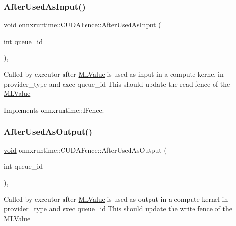 \subsubsection{\texorpdfstring{After\+Used\+As\+Input()}{AfterUsedAsInput()}}
{\footnotesize\ttfamily \mbox{\hyperlink{mlasi_8h_a88f941d423cb2a819b70a1358982b1a6}{void}} onnxruntime\+::\+C\+U\+D\+A\+Fence\+::\+After\+Used\+As\+Input (\begin{DoxyParamCaption}\item[{int}]{queue\+\_\+id }\end{DoxyParamCaption})\hspace{0.3cm}{\ttfamily [override]}, {\ttfamily [virtual]}}

Called by executor after \mbox{\hyperlink{classonnxruntime_1_1MLValue}{M\+L\+Value}} is used as input in a compute kernel in provider\+\_\+type and exec queue\+\_\+id This should update the read fence of the \mbox{\hyperlink{classonnxruntime_1_1MLValue}{M\+L\+Value}} 

Implements \mbox{\hyperlink{classonnxruntime_1_1IFence_af35eb555df9118afd4686e55f41b62a2}{onnxruntime\+::\+I\+Fence}}.

\mbox{\label{classonnxruntime_1_1CUDAFence_aa28331c001ce365edb1aca7e8c801c3f}} 
\subsubsection{\texorpdfstring{After\+Used\+As\+Output()}{AfterUsedAsOutput()}}
{\footnotesize\ttfamily \mbox{\hyperlink{mlasi_8h_a88f941d423cb2a819b70a1358982b1a6}{void}} onnxruntime\+::\+C\+U\+D\+A\+Fence\+::\+After\+Used\+As\+Output (\begin{DoxyParamCaption}\item[{int}]{queue\+\_\+id }\end{DoxyParamCaption})\hspace{0.3cm}{\ttfamily [override]}, {\ttfamily [virtual]}}

Called by executor after \mbox{\hyperlink{classonnxruntime_1_1MLValue}{M\+L\+Value}} is used as output in a compute kernel in provider\+\_\+type and exec queue\+\_\+id This should update the write fence of the \mbox{\hyperlink{classonnxruntime_1_1MLValue}{M\+L\+Value}} 

